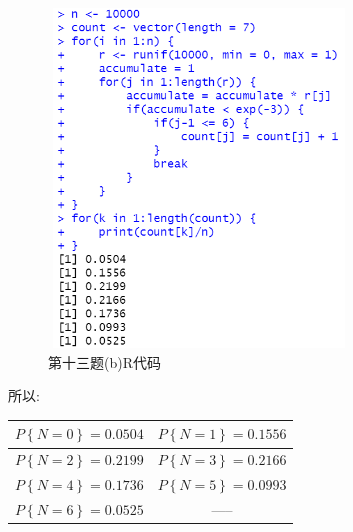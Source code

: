 \documentclass{book}
\begin{document}
\begin{figure}[H]
    \centering
    \includegraphics*[height = 9cm, width = 8cm]{gramFile/第十三题(b)运行截图.PNG}
    \caption{第十三题(b)R代码}
\end{figure}
\noindent
所以:
\begin{center}
    \begin{tabular}{|c|c|}
        \hline
        $P\left\{N=0\right\} = 0.0504$ & $P\left\{N=1\right\} = 0.1556$ \\
        \hline
        $P\left\{N=2\right\} = 0.2199$ & $P\left\{N=3\right\} = 0.2166$ \\
        \hline
        $P\left\{N=4\right\} = 0.1736$ & $P\left\{N=5\right\} = 0.0993$ \\
        \hline
        $P\left\{N=6\right\} = 0.0525$ & -----                          \\
        \hline
    \end{tabular}
\end{center}

\hspace*{\fill} \\
\end{document}
